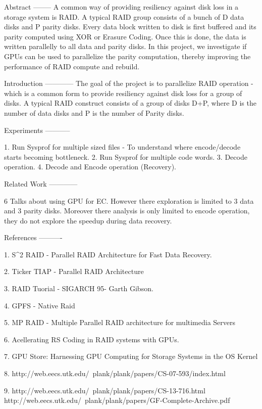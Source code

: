 Abstract
--------
A common way of providing resiliency against disk loss in a storage system is RAID. A typical RAID group consists of a bunch of D data disks and P parity disks. Every data block written to disk is first buffered and its parity computed using XOR or Erasure Coding. Once this is done, the data is written parallelly to all data and parity disks. In this project, we investigate if GPUs can be used to parallelize the parity computation, thereby improving the performance of RAID compute and rebuild.

Introduction
------------
The goal of the project is to parallelize RAID operation - which is a common form to provide resiliency against disk loss for a group of disks. A typical RAID construct consists of a group of disks D+P, where D is the number of data disks and P is the number of Parity disks.

Experiments
-----------

1. Run Sysprof for multiple sized files -  To understand where encode/decode starts becoming bottleneck.
2. Run Sysprof for multiple code words.
3. Decode operation.
4. Decode and Encode operation (Recovery).

Related Work
------------

6 Talks about using GPU for EC. However there exploration is limited to 3 data and 3 parity disks. Moreover there analysis is only limited to encode operation, they do not explore the speedup during data recovery.


References
----------

1. S^2 RAID - Parallel RAID Architecture for Fast Data Recovery.

2. Ticker TIAP - Parallel RAID Architecture

3. RAID Tuorial - SIGARCH 95- Garth Gibson.

4. GPFS - Native Raid

5. MP RAID - Multiple Parallel RAID architecture for multimedia Servers

6. Acellerating RS Coding in RAID systems with GPUs.

7. GPU Store: Harnessing GPU Computing for Storage Systems in the OS Kernel

8. http://web.eecs.utk.edu/~plank/plank/papers/CS-07-593/index.html

9. http://web.eecs.utk.edu/~plank/plank/papers/CS-13-716.html
http://web.eecs.utk.edu/~plank/plank/papers/GF-Complete-Archive.pdf

